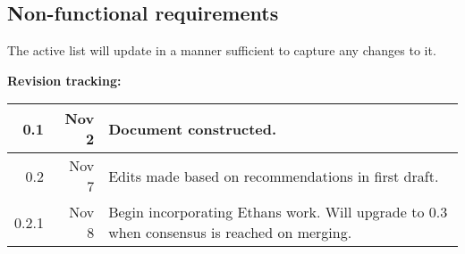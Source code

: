 \documentclass[12pt,a4paper]{article}
\begin{document}
\subsection{Non-functional requirements}
The active list will update in a manner sufficient to capture any changes to it.

\newpage
\textbf{Revision tracking:}\\
\begin{tabular}{|r|r|p{5.5in}|}
\hline
0.1 & Nov 2 & Document constructed.\\
\hline
0.2 & Nov 7 & Edits made based on recommendations in first draft.\\
\hline
0.2.1 & Nov 8 & Begin incorporating Ethans work. Will upgrade to 0.3 when consensus is reached on merging. \\
\hline

\end{tabular}
\end{document}
